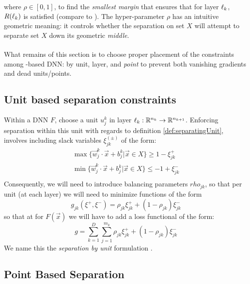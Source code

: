 where $\rho\in[0,1]$, to find the \emph{smallest margin} that ensures that for layer $\ell_k$, $R(\ell_k)$ is satisfied (compare to \cite{Burges1998TutorialOnSVMForPatternRecognition}). The hyper-parameter $\rho$ has an intuitive geometric meaning: it controls whether the separation on set $X$ will attempt to separate set $X$ down its geometric \emph{middle}. 
\\\\
What remains of this section is to choose proper placement of the constraints among \ReLU-based DNN: by unit, layer, and \emph{point} to prevent both vanishing gradients and dead units/points. 

\subsection{Unit based separation constraints \SepUnit}\label{subsec:sepUnit}
Within a \ReLU DNN $F$, choose a unit $u_j^k$ in layer $\ell_k:\mathbb{R}^{n_k}\rightarrow\mathbb{R}^{n_{k+1}}$. Enforcing
separation within this unit with regards to definition \ref{def:separatingUnit}, involves including slack variables $\xi_{jk}^{(\pm)}$ of the form:
\begin{equation}
    \begin{array}{lcl}
    \max\{\vec{w}^k_j\cdot\vec{x}+b^k_j|\vec{x}\in X\}\geq 1-\xi^{+}_{jk}\\
    \min\{\vec{w}^k_j\cdot\vec{x}+b^k_j|\vec{x}\in X\}\leq -1+\xi^{-}_{jk}\\
\end{array}
\end{equation}
Consequently, we will need to introduce balancing parameters $rho_{jk}$, so that per unit (at each layer) we will need to minimize functions of the form
\begin{equation}
    g_{jk}(\xi^{+},\xi^{-}) = \rho_{jk}\xi^{+}_{jk}+(1-\rho_{jk})\xi^{-}_{jk}
\end{equation}
so that at for $F(\vec{x})$ we will have to add a loss functional of the form:
\begin{equation}\label{eq:constraintLossForUnitSeparation}
    g = \sum_{k=1}^{D}\sum_{j=1}^{m_k}\rho_{jk}\xi^{+}_{jk}+(1-\rho_{jk})\xi^{-}_{jk}
\end{equation}
We name this the \emph{separation by unit} formulation \SepUnit.

\subsection{Point Based Separation \SepPoint}\label{subsec:sepPoint}

